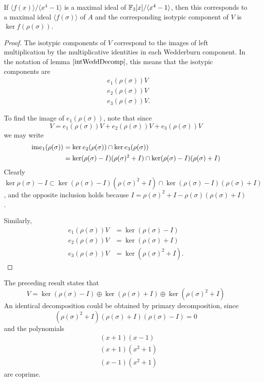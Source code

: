 \documentclass{unswmaths}
\begin{document}
\begin{proposition}
    If $\langle f(x)\rangle/\langle x^4-1\rangle$ is a maximal ideal of ${\mathbb{F}_3}[x]/\langle x^4-1\rangle$, then
    this corresponds to a maximal ideal $\langle f(\sigma)\rangle$ of $A$ and the corresponding
    isotypic component of $V$ is $\ker f(\rho(\sigma))$.
\end{proposition}
\begin{proof}
    The isotypic components of $V$ correspond to the images of left multiplication
    by the multiplicative identities in each Wedderburn component. In the notation
    of lemma $\ref{intWeddDecomp}$, 
    this means that the isotypic components are
    \begin{align*}
        &e_1(\rho(\sigma))V\\
        &e_2(\rho(\sigma))V\\
        &e_3(\rho(\sigma))V.
    \end{align*}
    
    To find the image of $e_1(\rho(\sigma))$, note that since
    \begin{equation*}
        V = e_1(\rho(\sigma))V+e_2(\rho(\sigma))V+e_3(\rho(\sigma))V
    \end{equation*}
    we may write
    \begin{align*}
        {\operatorname{im}} e_1(\rho(\sigma)) &= \ker e_2(\rho(\sigma))\cap\ker e_3(\rho(\sigma))\\
                              &= \ker (\rho(\sigma)-I)(\rho(\sigma)^2+I)\cap \ker (\rho(\sigma)-I)(\rho(\sigma)+I)
    \end{align*}
    Clearly $\ker \rho(\sigma)-I \subset \ker (\rho(\sigma)-I)(\rho(\sigma)^2+I)\cap \ker (\rho(\sigma)-I)(\rho(\sigma)+I)$,
    and the opposite inclusion holds because $I = \rho(\sigma)^2+I-\rho(\sigma)(\rho(\sigma)+I)$.
    
    Similarly,
    \begin{align*}
        e_1(\rho(\sigma))V &= \ker (\rho(\sigma)-I)\\
        e_2(\rho(\sigma))V &= \ker (\rho(\sigma)+I)\\
        e_3(\rho(\sigma))V &= \ker (\rho(\sigma)^2+I).
    \end{align*}    
\end{proof}
\begin{remark}
    The preceding result states that
    \begin{equation*}
        V = \ker (\rho(\sigma)-I)\oplus \ker (\rho(\sigma)+I)\oplus \ker (\rho(\sigma)^2+I)
    \end{equation*}
    An identical decomposition could be obtained by primary decomposition, since
    \begin{equation*}
        (\rho(\sigma)^2+I)(\rho(\sigma)+I)(\rho(\sigma)-I) = 0
    \end{equation*}
    and the polynomials
    \begin{align*}
        &(x+1)(x-1)\\
        &(x+1)(x^2+1)\\
        &(x-1)(x^2+1)
    \end{align*}
    are coprime.
\end{remark}
\end{document}
